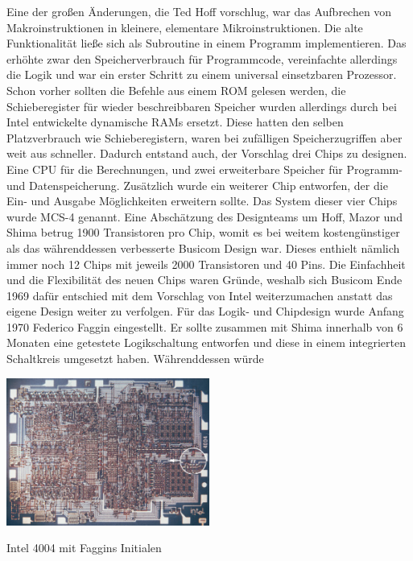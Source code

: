Eine der großen Änderungen, die Ted Hoff vorschlug, war das Aufbrechen von Makroinstruktionen in kleinere, elementare Mikroinstruktionen. Die alte Funktionalität ließe sich als Subroutine in einem Programm implementieren. Das erhöhte zwar den Speicherverbrauch für Programmcode,
vereinfachte allerdings die Logik und war ein erster Schritt zu einem universal
einsetzbaren Prozessor. Schon vorher sollten die Befehle aus einem ROM gelesen werden, die Schieberegister für wieder beschreibbaren Speicher wurden allerdings durch bei Intel entwickelte dynamische RAMs ersetzt. Diese hatten den selben Platzverbrauch wie Schieberegistern, waren bei zufälligen Speicherzugriffen aber weit aus schneller. Dadurch entstand auch, der Vorschlag drei Chips zu designen. Eine CPU für die Berechnungen, und zwei erweiterbare Speicher für Programm- und Datenspeicherung. Zusätzlich wurde ein weiterer Chip entworfen, der die Ein- und Ausgabe Möglichkeiten erweitern sollte. Das System dieser vier Chips wurde MCS-4 genannt.
Eine Abschätzung des Designteams um Hoff, Mazor und Shima betrug 1900 Transistoren pro Chip, womit es bei weitem kostengünstiger als das währenddessen verbesserte Busicom Design war.
Dieses enthielt nämlich immer noch 12 Chips mit jeweils 2000 Transistoren und 40 Pins.
Die Einfachheit und die Flexibilität des neuen Chips waren Gründe, weshalb sich Busicom Ende 1969 dafür entschied mit dem Vorschlag von Intel weiterzumachen anstatt das eigene Design weiter zu verfolgen. 
Für das Logik- und Chipdesign wurde Anfang 1970 Federico Faggin eingestellt. Er sollte zusammen mit Shima innerhalb von 6 Monaten eine getestete Logikschaltung entworfen und diese in einem integrierten Schaltkreis umgesetzt haben. Währenddessen würde
 \newline
 \vspace{-24pt}
 \begin{floatingfigure}[l]{.5\textwidth}
 	\includegraphics[width=0.5\textwidth]{figures/circuit.jpg}
 	\caption{Intel 4004 mit Faggins Initialen}
 	\label{fig:circuit}
 \end{floatingfigure} 
